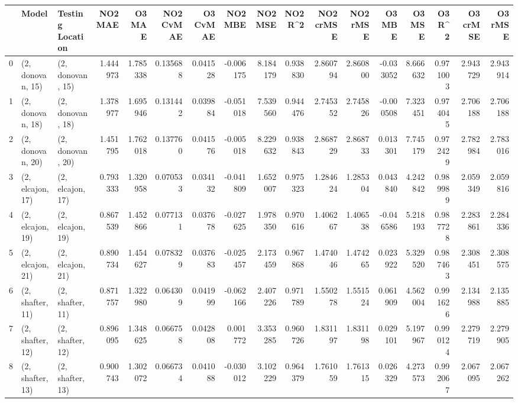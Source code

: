 \begin{tabular}{lllrrrrrrrrrrrrrr}
\toprule
{} &             Model &  Testing Location &   NO2 MAE &    O3 MAE &  NO2 CvMAE &  O3 CvMAE &   NO2 MBE &    NO2 MSE &   NO2 R\textasciicircum2 &  NO2 crMSE &  NO2 rMSE &    O3 MBE &     O3 MSE &    O3 R\textasciicircum2 &  O3 crMSE &   O3 rMSE \\
\midrule
0  &  (2, donovan, 15) &  (2, donovan, 15) &  1.444973 &  1.785338 &   0.135688 &  0.041528 & -0.006175 &   8.184179 &  0.938830 &   2.860794 &  2.860800 & -0.033052 &   8.666632 &  0.971003 &  2.943729 &  2.943914 \\
1  &  (2, donovan, 18) &  (2, donovan, 18) &  1.378977 &  1.695946 &   0.131442 &  0.039884 & -0.051018 &   7.539560 &  0.944476 &   2.745352 &  2.745826 & -0.000508 &   7.323451 &  0.974045 &  2.706188 &  2.706188 \\
2  &  (2, donovan, 20) &  (2, donovan, 20) &  1.451795 &  1.762018 &   0.137760 &  0.041576 & -0.005018 &   8.229632 &  0.938843 &   2.868729 &  2.868733 &  0.013301 &   7.745179 &  0.972429 &  2.782984 &  2.783016 \\
3  &  (2, elcajon, 17) &  (2, elcajon, 17) &  0.793333 &  1.320958 &   0.070533 &  0.034132 & -0.041809 &   1.652007 &  0.975323 &   1.284624 &  1.285304 &  0.043840 &   4.242842 &  0.989989 &  2.059349 &  2.059816 \\
4  &  (2, elcajon, 19) &  (2, elcajon, 19) &  0.867539 &  1.452866 &   0.077131 &  0.037678 & -0.027625 &   1.978350 &  0.970616 &   1.406267 &  1.406538 & -0.046586 &   5.218193 &  0.987728 &  2.283861 &  2.284336 \\
5  &  (2, elcajon, 21) &  (2, elcajon, 21) &  0.890734 &  1.454627 &   0.078329 &  0.037683 & -0.025457 &   2.173459 &  0.967868 &   1.474046 &  1.474265 &  0.023922 &   5.329520 &  0.987463 &  2.308451 &  2.308575 \\
6  &  (2, shafter, 11) &  (2, shafter, 11) &  0.871757 &  1.322980 &   0.064309 &  0.041999 & -0.062166 &   2.407226 &  0.971789 &   1.550278 &  1.551524 &  0.061909 &   4.562004 &  0.991626 &  2.134988 &  2.135885 \\
7  &  (2, shafter, 12) &  (2, shafter, 12) &  0.896095 &  1.348625 &   0.066758 &  0.042808 &  0.001772 &   3.353285 &  0.960726 &   1.831197 &  1.831198 &  0.029101 &   5.197967 &  0.990124 &  2.279719 &  2.279905 \\
8  &  (2, shafter, 13) &  (2, shafter, 13) &  0.900743 &  1.302072 &   0.066734 &  0.041088 & -0.030012 &   3.102229 &  0.964379 &   1.761059 &  1.761315 &  0.026329 &   4.273573 &  0.992067 &  2.067095 &  2.067262 \\

\end{tabular}
